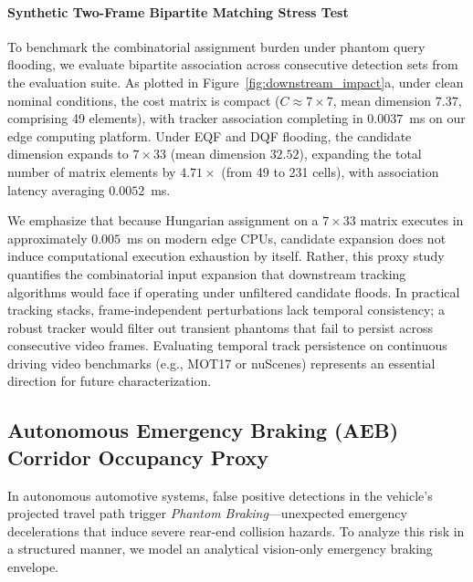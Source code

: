 \documentclass[preprint,12pt]{elsarticle}
\begin{document}
\paragraph{Synthetic Two-Frame Bipartite Matching Stress Test}
To benchmark the combinatorial assignment burden under phantom query flooding, we evaluate bipartite association across consecutive detection sets from the evaluation suite. As plotted in Figure~\ref{fig:downstream_impact}a, under clean nominal conditions, the cost matrix is compact ($C \approx 7 \times 7$, mean dimension $7.37$, comprising 49 elements), with tracker association completing in $0.0037$~ms on our edge computing platform. Under EQF and DQF flooding, the candidate dimension expands to $7 \times 33$ (mean dimension $32.52$), expanding the total number of matrix elements by $4.71\times$ (from 49 to 231 cells), with association latency averaging $0.0052$~ms.

We emphasize that because Hungarian assignment on a $7\times 33$ matrix executes in approximately $0.005$~ms on modern edge CPUs, candidate expansion does not induce computational execution exhaustion by itself. Rather, this proxy study quantifies the combinatorial input expansion that downstream tracking algorithms would face if operating under unfiltered candidate floods. In practical tracking stacks, frame-independent perturbations lack temporal consistency; a robust tracker would filter out transient phantoms that fail to persist across consecutive video frames. Evaluating temporal track persistence on continuous driving video benchmarks (e.g., MOT17 or nuScenes) represents an essential direction for future characterization.

\subsection{Autonomous Emergency Braking (AEB) Corridor Occupancy Proxy}
In autonomous automotive systems, false positive detections in the vehicle's projected travel path trigger \textit{Phantom Braking}---unexpected emergency decelerations that induce severe rear-end collision hazards. To analyze this risk in a structured manner, we model an analytical vision-only emergency braking envelope.
\end{document}
